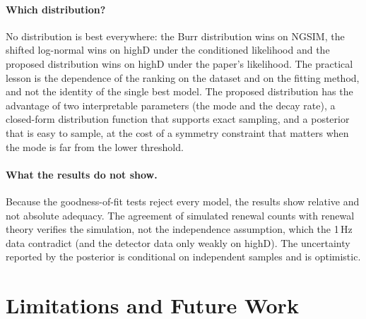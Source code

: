\documentclass[11pt,a4paper]{article}
\numberwithin{equation}{section}
\begin{document}
\paragraph{Which distribution?} No distribution is best everywhere: the Burr distribution wins on NGSIM, the shifted log-normal wins on highD under the conditioned likelihood and the proposed distribution wins on highD under the paper's likelihood. The practical lesson is the dependence of the ranking on the dataset and on the fitting method, and not the identity of the single best model.
The proposed distribution has the advantage of two interpretable parameters (the mode and the decay rate), a closed-form distribution function that supports exact sampling, and a posterior that is easy to sample, at the cost of a symmetry constraint that matters when the mode is far from the lower threshold.

\paragraph{What the results do not show.} Because the goodness-of-fit tests reject every model, the results show relative and not absolute adequacy. The agreement of simulated renewal counts with renewal theory verifies the simulation, not the independence
assumption, which the 1\,Hz data contradict (and the detector data only weakly on highD). The uncertainty reported by the posterior is conditional on independent samples and is optimistic.

\section{Limitations and Future Work}\label{sec:limits}
\end{document}
